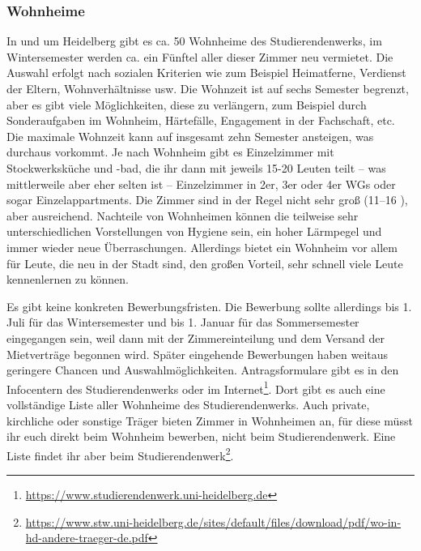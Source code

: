 \subsubsection{Wohnheime}


In und um Heidelberg gibt es ca. 50 Wohnheime des Studierendenwerks, im Wintersemester werden ca. ein Fünftel aller dieser Zimmer neu vermietet. Die Auswahl erfolgt nach sozialen Kriterien wie zum Beispiel Heimatferne, Verdienst der Eltern, Wohnverhältnisse usw. Die Wohnzeit ist auf sechs Semester begrenzt, aber es gibt viele Möglichkeiten, diese zu verlängern, zum Beispiel durch Sonderaufgaben im Wohnheim, Härtefälle, Engagement in der Fachschaft, etc. Die maximale Wohnzeit kann auf insgesamt zehn Semester ansteigen, was durchaus vorkommt. Je nach Wohnheim gibt es Einzelzimmer mit Stockwerksküche und -bad, die ihr dann mit jeweils 15-20 Leuten teilt -- was mittlerweile aber eher selten ist -- Einzelzimmer in 2er, 3er oder 4er WGs oder sogar Einzelappartments. Die Zimmer sind in der Regel nicht sehr groß (11--16 \squaren\metre), aber ausreichend. Nachteile von Wohnheimen können die teilweise sehr unterschiedlichen Vorstellungen von Hygiene sein, ein hoher Lärmpegel und immer wieder neue Überraschungen. Allerdings bietet ein Wohnheim vor allem für Leute, die neu in der Stadt sind, den großen Vorteil, sehr schnell viele Leute kennenlernen zu können.

Es gibt keine konkreten Bewerbungsfristen. Die Bewerbung sollte allerdings bis 1. Juli für das Wintersemester und bis 1. Januar für das Sommersemester eingegangen sein, weil dann mit der Zimmereinteilung und dem Versand der Mietverträge begonnen wird. Später eingehende Bewerbungen haben weitaus geringere Chancen und Auswahlmöglichkeiten. Antragsformulare gibt es in den Infocentern des Studierendenwerks oder im Internet\footnote{\url{https://www.studierendenwerk.uni-heidelberg.de}}. Dort gibt es auch eine vollständige Liste aller Wohnheime des Studierendenwerks. Auch private, kirchliche oder sonstige Träger bieten Zimmer in Wohnheimen an, für diese müsst ihr euch direkt beim Wohnheim bewerben, nicht beim Studierendenwerk. Eine Liste findet ihr aber beim Studierendenwerk\footnote{\url{https://www.stw.uni-heidelberg.de/sites/default/files/download/pdf/wo-in-hd-andere-traeger-de.pdf}}.
